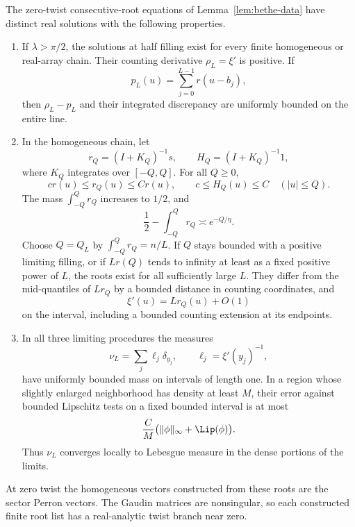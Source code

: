 \begin{lemma}\label{lem:root-limits}
The zero-twist consecutive-root equations of
Lemma~\ref{lem:bethe-data} have distinct real solutions with the
following properties.
\begin{enumerate}
\item If $\lambda>\pi/2$, the solutions at half filling exist for
 every finite homogeneous or real-array chain.  Their counting
 derivative $\rho_L=\xi'$ is positive.  If
 \[
 p_L(u)=\sum_{j=0}^{L-1}r(u-b_j),
 \]
 then $\rho_L-p_L$ and their integrated discrepancy are uniformly
 bounded on the entire line.
\item In the homogeneous chain, let
 \[
 r_Q=(I+K_Q)^{-1}s,\qquad H_Q=(I+K_Q)^{-1}1,
 \]
 where $K_Q$ integrates over $[-Q,Q]$.  For all $Q\ge0$,
 \begin{equation}\label{eq:regular-density-comparison}
 c r(u)\le r_Q(u)\le C r(u),\qquad
 c\le H_Q(u)\le C\quad (|u|\le Q).
 \end{equation}
 The mass $\int_{-Q}^Q r_Q$ increases to $1/2$, and
 \[
 \frac12-\int_{-Q}^Q r_Q\asymp e^{-Q/\eta}.
 \]
 Choose $Q=Q_L$ by $\int_{-Q}^Q r_Q=n/L$.
 If $Q$ stays bounded with a positive limiting filling, or if
 $Lr(Q)$ tends to infinity at least as a fixed positive power of
 $L$, the roots exist for all sufficiently large $L$.  They differ
 from the mid-quantiles of $Lr_Q$ by a bounded distance in counting
 coordinates, and
 \begin{equation}\label{eq:regular-counting-density}
 \xi'(u)=Lr_Q(u)+O(1)
 \end{equation}
 on the interval, including a bounded counting extension at its
 endpoints.
\item In all three limiting procedures the measures
 \[
 \nu_L=\sum_j\ell_j\delta_{y_j},\qquad
 \ell_j=\xi'(y_j)^{-1},
 \]
 have uniformly bounded mass on intervals of length one.  In a
 region whose slightly enlarged neighborhood has density at least
 $M$, their error against bounded Lipschitz tests on a fixed
 bounded interval is at most
 \begin{equation}\label{eq:local-quadrature}
 \frac{C}{M}\bigl(\|\phi\|_\infty+\Lip(\phi)\bigr).
 \end{equation}
 Thus $\nu_L$ converges locally to Lebesgue measure in the dense
 portions of the limits.
\end{enumerate}
At zero twist the homogeneous vectors constructed from these roots
are the sector Perron vectors.  The Gaudin matrices are nonsingular,
so each constructed finite root list has a real-analytic twist branch
near zero.
\end{lemma}

